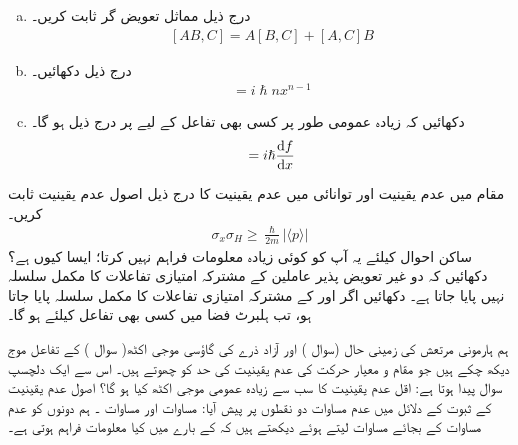 \begin{enumerate}[a.]
\item
 درج ذیل مماثل تعویض گر ثابت کریں۔
\begin{align}\label{مساوات_قواعد_ایک_مقالب_مماثل}
[ AB,C ] = A[B,C] + [A,C]B
\end{align}
\item
 درج ذیل دکھائیں۔ 
\begin{align*}
[x^{n},p] = i\hslash nx^{n-1}
\end{align*}
\item
 دکھائیں کہ زیادہ عمومی طور پر کسی بھی تفاعل  کے لیے پر درج ذیل ہو گا۔ 
\begin{align}
[f(x) , p] = i\hslash \frac{\dif f}{\dif x}
\end{align}
\end{enumerate}
مقام  میں عدم یقینیت اور توانائی  میں عدم یقینیت کا درج ذیل اصول عدم یقینیت ثابت کریں۔
\begin{align*}
\sigma_{x}\sigma_{H} \geq \frac{\hslash}{2m}|\langle p \rangle |
\end{align*}
ساکن احوال کیلئے یہ آپ کو کوئی زیادہ معلومات فراہم نہیں کرتا؛ ایسا کیوں ہے؟
دکھائیں کہ دو غیر  تعویض پذیر عاملین کے مشترکہ امتیازی تفاعلات کا مکمل سلسلہ نہیں پایا جاتا ہے۔
 دکھائیں اگر  اور  کے مشترکہ امتیازی تفاعلات کا مکمل سلسلہ پایا جاتا ہو، تب ہلبرٹ فضا میں کسی بھی تفاعل کیلئے  ہو گا۔


ہم ہارمونی مرتعش کی زمینی حال (سوال ) اور آزاد ذرے کی گاؤسی موجی اکٹھ( سوال ) کے تفاعل موج دیکھ چکے ہیں جو مقام و معیار حرکت کی عدم یقینیت کی
 حد  کو چھوتے ہیں۔ اس سے ایک دلچسپ سوال پیدا ہوتا ہے: اقل عدم یقینیت کا سب سے زیادہ عمومی موجی اکٹھ کیا ہو گا؟ اصول عدم یقینیت کے ثبوت کے دلائل میں عدم مساوات دو نقطوں پر پیش آیا: مساوات  اور مساوات ۔ ہم دونوں کو عدم مساوات کے بجائے مساوات لیتے ہوئے دیکھتے ہیں کہ  کے بارے میں کیا معلومات فراہم ہوتی ہے۔
 
